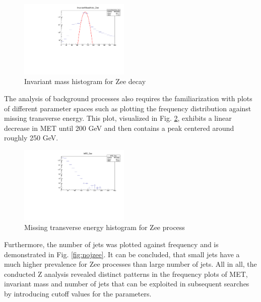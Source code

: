 \documentclass[runningheads,a4paper]{llncs}
\begin{document}
\begin{figure}
\centering
\includegraphics[height=3.7cm]{InvM_Zee_fit}
\caption{Invariant mass histogram for Zee decay}
\label{fig:invmzee}
\end{figure}

The analysis of background processes also requires the familiarization with plots of different parameter spaces such as plotting the frequency distribution against missing transverse energy. This plot, visualized in Fig. \ref{fig:mtezee}, exhibits a linear decrease in MET until 200 GeV and then contains a peak centered around roughly 250 GeV.

\begin{figure}
\centering
\includegraphics[height=3.7cm]{MTE_Zee+new}
\caption{Missing transverse energy histogram for Zee process}
\label{fig:mtezee}
\end{figure}

Furthermore, the number of jets was plotted against frequency and is demonstrated in Fig. \ref{fig:nojzee}. It can be concluded, that small jets have a much higher prevalence for Zee processes than large number of jets. All in all, the conducted Z analysis revealed distinct patterns in the frequency plots of MET, invariant mass and number of jets that can be exploited in subsequent searches by introducing cutoff values for the parameters.
\end{document}
